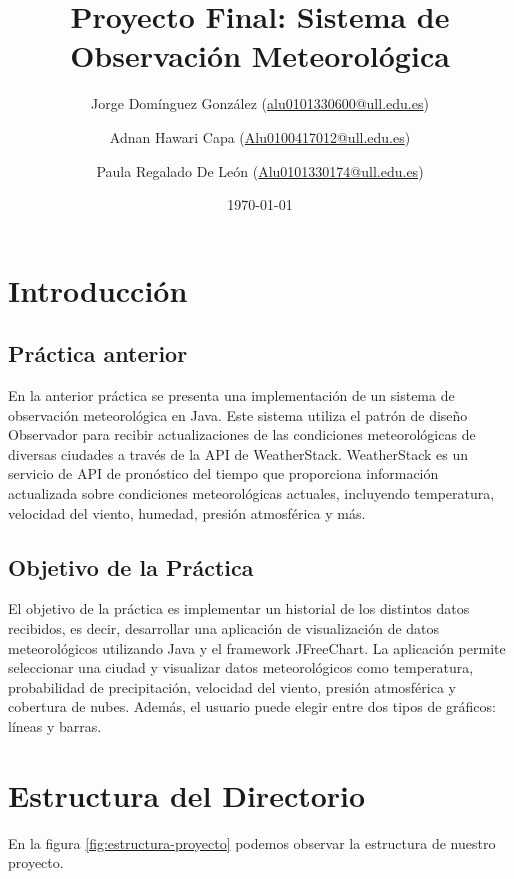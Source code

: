 \documentclass{article}
\title{\Huge \textbf{Proyecto Final: Sistema de Observación Meteorológica}}
\author{
  Jorge Domínguez González (\href{mailto:alu0101330600@ull.edu.es}{alu0101330600@ull.edu.es}) \and
  Adnan Hawari Capa (\href{mailto:Alu0100417012@ull.edu.es}{Alu0100417012@ull.edu.es}) \and
  Paula Regalado De León (\href{mailto:Alu0101330174@ull.edu.es}{Alu0101330174@ull.edu.es})
}
\date{\today}
\begin{document}
\maketitle

\tableofcontents
\listoffigures
\newpage

\section{Introducción}
\subsection{Práctica anterior}
En la anterior práctica se presenta una implementación de un sistema de observación meteorológica en Java. Este sistema utiliza el patrón de diseño Observador para recibir actualizaciones de las condiciones meteorológicas de diversas ciudades a través de la API de WeatherStack. WeatherStack es un servicio de API de pronóstico del tiempo que proporciona información actualizada sobre condiciones meteorológicas actuales, incluyendo temperatura, velocidad del viento, humedad, presión atmosférica y más.

\subsection{Objetivo de la Práctica}
El objetivo de la práctica es implementar un historial de los distintos datos recibidos, es decir, desarrollar una aplicación de visualización de datos meteorológicos utilizando Java y el framework JFreeChart. La aplicación permite seleccionar una ciudad y visualizar datos meteorológicos como temperatura, probabilidad de precipitación, velocidad del viento, presión atmosférica y cobertura de nubes. Además, el usuario puede elegir entre dos tipos de gráficos: líneas y barras.

\section{Estructura del Directorio}
En la figura \ref{fig:estructura-proyecto} podemos observar la estructura de nuestro proyecto.
\end{document}
